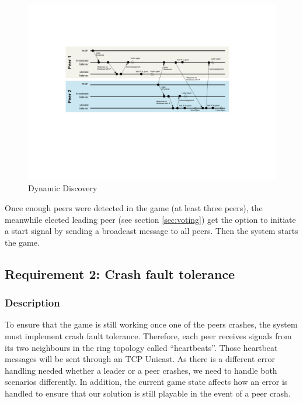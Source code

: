 \documentclass[runningheads]{llncs}
\begin{document}
            \begin{figure}[h]
                \includegraphics[width=\textwidth]{dynamic_dicovery.pdf}
                \caption{Dynamic Discovery} \label{fig:dynamic_discovery}
            \end{figure}
            
            Once enough peers were detected in the game (at least three peers), the meanwhile elected leading peer (see section \ref{sec:voting}) get the option to initiate a start signal by sending a broadcast message to all peers. Then the system starts the game.
        
    \subsection{Requirement 2: Crash fault tolerance} \label{sec:fault-tolerance}
        \subsubsection{Description}
            To ensure that the game is still working once one of the peers crashes, the system must implement crash fault tolerance. Therefore, each peer receives signals from its two neighbours in the ring topology called \enquote{heartbeats}. Those heartbeat messages will be sent through an TCP Unicast. As there is a different error handling needed whether a leader or a peer crashes, we need to handle both scenarios differently. In addition, the current game state affects how an error is handled to ensure that our solution is still playable in the event of a peer crash.
            
\end{document}
